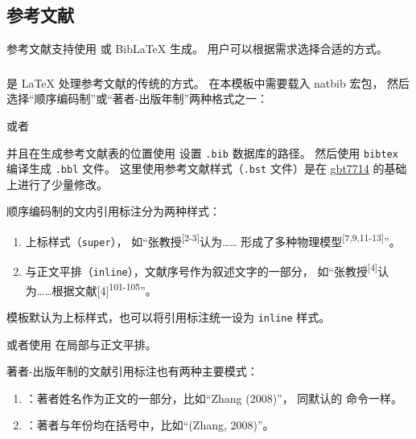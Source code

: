 \documentclass[a4paper]{ltxdoc}
\DeclareRobustCommand\file{\nolinkurl}
\DeclareRobustCommand\pkg{\textsf}
\DeclareRobustCommand\opt{\texttt}
\begin{document}
\subsection{参考文献}

参考文献支持使用 \BibTeX{} 或 BibLaTeX 生成。
用户可以根据需求选择合适的方式。


\subsubsection{\BibTeX}

\BibTeX{} 是 \LaTeX{} 处理参考文献的传统的方式。
在本模板中需要载入 \pkg{natbib} 宏包，
然后选择“顺序编码制”或“著者-出版年制”两种格式之一：
\begin{latex}
  \usepackage[sort]{natbib}
  
\end{latex}
或者
\begin{latex}
  \usepackage{natbib}
  
\end{latex}
并且在生成参考文献表的位置使用  设置 \file{.bib} 数据库的路径。
然后使用 \file{bibtex} 编译生成 \file{.bbl} 文件。
这里使用参考文献样式（\file{.bst} 文件）是在
\href{https://ctan.org/pkg/gbt7714}{\pkg{gbt7714}}
的基础上进行了少量修改。

顺序编码制的文内引用标注分为两种样式：
\begin{enumerate}
  \item 上标样式（\opt{super}）， 如“张教授\textsuperscript{[2-3]}认为……
    形成了多种物理模型\textsuperscript{[7,9,11-13]}”。
  \item 与正文平排（\opt{inline}），文献序号作为叙述文字的一部分，
    如“张教授\textsuperscript{[4]}认为……根据文献[4]\textsuperscript{101-105}”。
\end{enumerate}

模板默认为上标样式，也可以将引用标注统一设为 \opt{inline} 样式。
\begin{latex}
\end{latex}
或者使用  在局部与正文平排。

著者-出版年制的文献引用标注也有两种主要模式：
\begin{enumerate}
  \item {}：著者姓名作为正文的一部分，比如“Zhang (2008)”，
    同默认的  命令一样。
  \item {}：著者与年份均在括号中，比如“(Zhang, 2008)”。
\end{enumerate}
\end{document}
